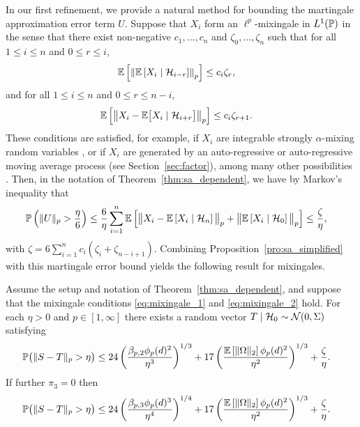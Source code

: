 In our first refinement, we provide a natural method for bounding the
martingale approximation error term $U$. Suppose that $X_i$ form an
$\ell^p$-mixingale in $L^1(\P)$ in the sense that there exist non-negative
$c_1, \ldots, c_n$ and $\zeta_0, \ldots, \zeta_n$ such that for all
$1 \leq i \leq n$ and $0 \leq r \leq i$,
%
\begin{align}
  \label{eq:mixingale_1}
  \E \left[ \left\|
    \E \left[ X_i \mid \cH_{i-r} \right]
  \right\|_p \right]
  &\leq
  c_i \zeta_r,
\end{align}
%
and for all $1 \leq i \leq n$ and $0 \leq r \leq n-i$,
%
\begin{align}
  \label{eq:mixingale_2}
  \E \left[ \big\|
    X_i - \E \big[ X_i \mid \cH_{i+r} \big]
  \big\|_p \right]
  &\leq
  c_i \zeta_{r+1}.
\end{align}
%
These conditions are satisfied, for example, if $X_i$ are integrable strongly
$\alpha$-mixing random variables \citep{mcleish1975invariance}, or if $X_i$ are
generated by an auto-regressive or auto-regressive moving average process (see
Section~\ref{sec:factor}), among many other possibilities
\citep{bradley2005basic}. Then, in the notation of
Theorem~\ref{thm:sa_dependent}, we have by Markov's inequality that
%
\begin{align*}
  \P \left( \|U\|_p > \frac{\eta}{6} \right)
  &\leq
  \frac{6}{\eta}
  \sum_{i=1}^{n}
  \E \left[
    \big\|
    X_i - \E \left[ X_i \mid \cH_n \right]
    \big\|_p
    + \big\|
    \E \left[ X_i \mid \cH_0 \right]
    \big\|_p
  \right]
  \leq \frac{\zeta}{\eta},
\end{align*}
%
with $\zeta = 6 \sum_{i=1}^{n} c_i (\zeta_{i} + \zeta_{n-i+1})$.
Combining Proposition~\ref{pro:sa_simplified} with this
martingale error bound yields the following result for mixingales.
%
\begin{corollary}%
  \label{cor:sa_mixingale}

  Assume the setup and notation of Theorem~\ref{thm:sa_dependent}, and suppose
  that the mixingale conditions \eqref{eq:mixingale_1} and
  \eqref{eq:mixingale_2} hold. For each $\eta > 0$ and $p \in [1,\infty]$ there
  exists a random vector $T \mid \cH_0 \sim \cN(0, \Sigma)$ satisfying
  \begin{align*}
    \P\big(\|S-T\|_p > \eta\big)
    &\leq
    24 \left(
      \frac{\beta_{p,2} \phi_p(d)^2}{\eta^3}
    \right)^{1/3}
    + 17 \left(
      \frac{\E \left[ \|\Omega\|_2 \right] \phi_p(d)^2}{\eta^2}
    \right)^{1/3}
    + \frac{\zeta}{\eta}.
  \end{align*}
  If further $\pi_3 = 0$ then
  \begin{align*}
    \P\big(\|S-T\|_p > \eta\big)
    &\leq
    24 \left(
      \frac{\beta_{p,3} \phi_p(d)^3}{\eta^4}
    \right)^{1/4}
    + 17 \left(
      \frac{\E \left[ \|\Omega\|_2 \right] \phi_p(d)^2}{\eta^2}
    \right)^{1/3}
    + \frac{\zeta}{\eta}.
  \end{align*}
\end{corollary}

